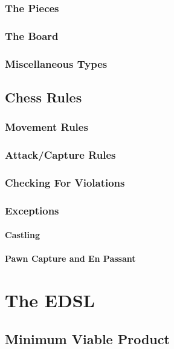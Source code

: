 \documentclass[12pt, a4paper, bibliography=totocnumbered]{scrreprt}
\begin{document}
\subsection{The Pieces}

\subsection{The Board}

\subsection{Miscellaneous Types}

\section{Chess Rules}

\subsection{Movement Rules}

\subsection{Attack/Capture Rules}

\subsection{Checking For Violations}

\subsection{Exceptions}

\subsubsection{Castling}

\subsubsection{Pawn Capture and En Passant}

\chapter{The EDSL}

\section{Minimum Viable Product}
\end{document}
